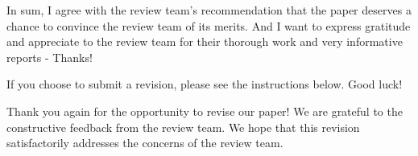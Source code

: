 \documentclass[11pt]{article}
\newcounter{se}[section]
\newenvironment{se*}[1][]{%
    \par\medskip%
    \rmfamily\itshape%
}{\medskip}
\begin{document}
\begin{se*}

In sum, I agree with the review team's recommendation that the paper deserves a chance to convince the review team of its merits. And I want to express gratitude and appreciate to the review team for their thorough work and very informative reports - Thanks! 

If you choose to submit a revision, please see the instructions below. Good luck!  

\end{se*}



\vspace*{0.5\baselineskip}

\textsf{Thank you again for the opportunity to revise our paper! We are grateful to the constructive feedback from the review team. We hope that this revision satisfactorily addresses the concerns of the review team.}
\end{document}

